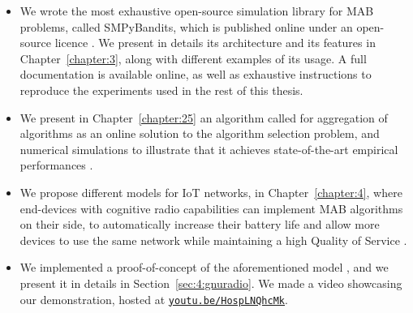 \begin{itemize}


    \item
    We wrote the most exhaustive open-source simulation library for MAB problems, called SMPyBandits, which is published online under an open-source licence \cite{SMPyBandits,SMPyBanditsJMLR}.
    We present in details its architecture and its features in Chapter~\ref{chapter:3}, along with different examples of its usage.
    A full documentation is available online, as well as exhaustive instructions to reproduce the experiments used in the rest of this thesis.

    \item
    We present in Chapter~\ref{chapter:25} an algorithm called \Aggr{} for aggregation of algorithms as an online solution to the algorithm selection problem, and numerical simulations to illustrate that it achieves state-of-the-art empirical performances
    \cite{Besson2018WCNC}.

    \item
    We propose different models for IoT networks, in Chapter~\ref{chapter:4}, where end-devices with cognitive radio capabilities can implement MAB algorithms on their side, to automatically increase their battery life and allow more devices to use the same network while maintaining a high Quality of Service
    \cite{Bonnefoi17,Besson2019WCNC,Bonnefoi2019WCNC}.

    \item
    We implemented a proof-of-concept of the aforementioned model \cite{Besson2018ICT}, and we present it in details in Section~\ref{sec:4:gnuradio}. We made a video showcasing our demonstration, hosted at \texttt{\href{https://youtu.be/HospLNQhcMk}{youtu.be/HospLNQhcMk}}.


\end{itemize}
